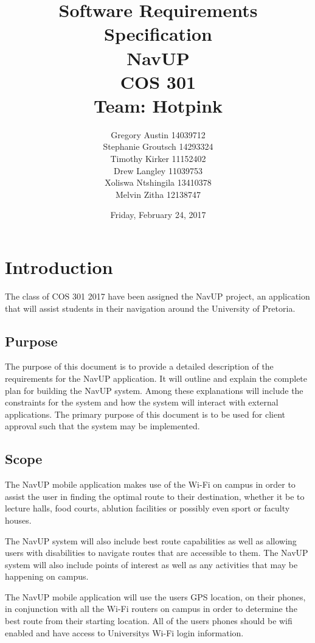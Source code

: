 \documentclass[11pt,a4paper]{article}
\title{Software Requirements Specification \\ NavUP \\ COS 301 \\ Team: Hotpink}
\date{Friday, February 24, 2017}
\author{Gregory Austin 14039712 \\ Stephanie Groutsch 14293324 \\ Timothy Kirker 11152402 \\ Drew Langley 11039753 \\ Xoliswa Ntshingila 13410378
\\ Melvin Zitha 12138747}
\begin{document}
\maketitle
\newpage
\tableofcontents

\newpage
\section{Introduction}
The class of COS 301 2017 have been assigned the NavUP project, an application that will assist students in their navigation around the University of Pretoria.

	\subsection{Purpose}
	The purpose of this document is to provide a detailed description of the requirements for the NavUP application. It will outline and explain the complete plan for building the NavUP system.
	Among these explanations will include the constraints for the system and how the system will interact with external applications. The primary purpose of this document is to be used for client approval such that the system may be implemented.


	\subsection{Scope}
	The NavUP mobile application makes use of the Wi-Fi on campus in order to assist the user in finding the optimal route to their destination, whether it be to lecture halls, food courts, ablution facilities or possibly even sport or faculty houses.
	\\
\par
	The NavUP system will also include best route capabilities as well as allowing users with disabilities to navigate routes that are accessible to them. The NavUP system will also include points of interest as well as any activities that may be happening on campus.
\\
\par
	The NavUP mobile application will use the users GPS location, on their phones, in conjunction with all the Wi-Fi routers on campus in order to determine the best route from their starting location. All of the users phones should be wifi enabled and have access to Universitys Wi-Fi login information.
	
\end{document}
